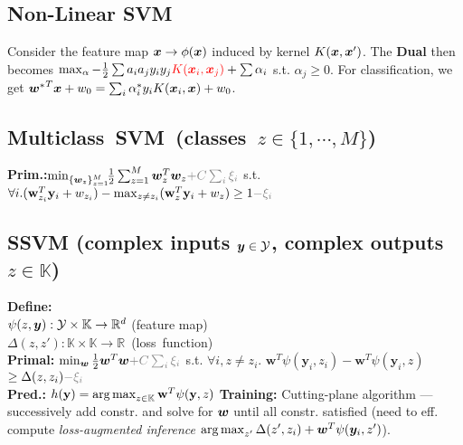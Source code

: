 \subsection*{Non-Linear SVM}
Consider the feature map ${\bm{x}} \rightarrow \phi({\bm{x}})$ induced by kernel $K({\bm{x}}, {\bm{x}}')$. The \textbf{Dual} then becomes $\max_\alpha -\frac{1}{2}\sum a_ia_jy_iy_j{\color{red}K({\bm{x}}_i, {\bm{x}}_j)} + \sum\alpha_i$ s.t.
$\alpha_j\geq 0$. For classification, we get ${{\bm{w}}^*}^T{\bm{x}} + w_0 = \sum_i \alpha_i^*y_iK({\bm{x}}_i, {\bm{x}}) + w_0$.

\subsection*{\mbox{Multiclass SVM (classes $z\in\{1,\cdots,M\}$)}}
\textbf{Prim.:}$\min_{\{\vw_z\}_{z=1}^M}\!\!\frac{1}{2}\sum_{z=1}^M \vw^T_z\vw_z {\color{gray} + C\sum_i \xi_i}$ s.t.
$\forall i. (\mathbf{w}_{z_i}^T\mathbf{y}_i+w_{z_i})-\max_{z\not=z_i}(\mathbf{w}_z^T\mathbf{y}_i+w_{z})\geq 1{\color{gray}-\xi_i}$

\subsection*{SSVM (complex inputs ${\bm{y}}\in\mathcal{Y}$, complex outputs $z\in\mathbb{K}$)}
\textbf{Define:}\\$\psi(z,{\bm{y}}):\mathcal{Y}\times\mathbb{K}\to \mathbb{R}^d$ (feature map)\\
\mbox{$\Delta(z,z'):\mathbb{K}\times\mathbb{K}\to \mathbb{R}$ (loss function)}\\
\textbf{Primal:}
$\min_\vw \frac{1}{2}\vw^T\vw {\color{gray} + C\sum_i \xi_i}$ s.t.
\mbox{$\forall i,z\neq z_i.\,\,\mathbf{w}^T\psi(\mathbf{y}_i,z_i)-\mathbf{w}^T\psi(\mathbf{y}_i,z)$}\\$\geq \Delta(z, z_i){\color{gray}-\xi_i}$\\
\textbf{Pred.:} \mbox{$h(\mathbf{y}) = \operatorname*{arg\,max}_{z\in\mathbb{K}} \mathbf{w}^T\psi(\mathbf{y},z)$}
\textbf{Training:} Cutting-plane algorithm --- successively add constr. and solve for ${\bm{w}}$ until all constr. satisfied (need to eff. compute \emph{loss-augmented inference} $\operatorname*{arg\,max}_{z'}\Delta(z', z_i) + {\bm{w}}^T\psi({\bm{y}}_i, z')$).



